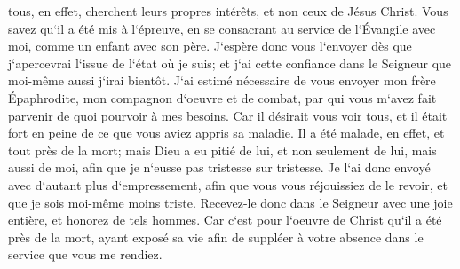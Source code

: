 \verse tous, en effet, cherchent leurs propres intérêts, et non ceux de Jésus Christ. 
\verse Vous savez qu`il a été mis à l`épreuve, en se consacrant au service de l`Évangile avec moi, comme un enfant avec son père. 
\verse J`espère donc vous l`envoyer dès que j`apercevrai l`issue de l`état où je suis; 
\verse et j`ai cette confiance dans le Seigneur que moi-même aussi j`irai bientôt. 
\verse J`ai estimé nécessaire de vous envoyer mon frère Épaphrodite, mon compagnon d`oeuvre et de combat, par qui vous m`avez fait parvenir de quoi pourvoir à mes besoins. 
\verse Car il désirait vous voir tous, et il était fort en peine de ce que vous aviez appris sa maladie. 
\verse Il a été malade, en effet, et tout près de la mort; mais Dieu a eu pitié de lui, et non seulement de lui, mais aussi de moi, afin que je n`eusse pas tristesse sur tristesse. 
\verse Je l`ai donc envoyé avec d`autant plus d`empressement, afin que vous vous réjouissiez de le revoir, et que je sois moi-même moins triste. 
\verse Recevez-le donc dans le Seigneur avec une joie entière, et honorez de tels hommes. 
\verse Car c`est pour l`oeuvre de Christ qu`il a été près de la mort, ayant exposé sa vie afin de suppléer à votre absence dans le service que vous me rendiez. 

